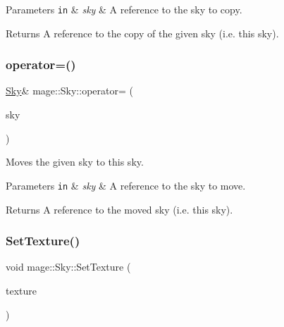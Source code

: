 \begin{DoxyParams}[1]{Parameters}
\mbox{\tt in}  & {\em sky} & A reference to the sky to copy. \\
\hline
\end{DoxyParams}
\begin{DoxyReturn}{Returns}
A reference to the copy of the given sky (i.\+e. this sky). 
\end{DoxyReturn}
\hypertarget{structmage_1_1_sky_a07e7ad68f471344d06357ea68b82ef84}{}\label{structmage_1_1_sky_a07e7ad68f471344d06357ea68b82ef84} 
\subsubsection{\texorpdfstring{operator=()}{operator=()}\hspace{0.1cm}{\footnotesize\ttfamily [2/2]}}
{\footnotesize\ttfamily \hyperlink{structmage_1_1_sky}{Sky}\& mage\+::\+Sky\+::operator= (\begin{DoxyParamCaption}\item[{\hyperlink{structmage_1_1_sky}{Sky} \&\&}]{sky }\end{DoxyParamCaption})\hspace{0.3cm}{\ttfamily [delete]}}

Moves the given sky to this sky.


\begin{DoxyParams}[1]{Parameters}
\mbox{\tt in}  & {\em sky} & A reference to the sky to move. \\
\hline
\end{DoxyParams}
\begin{DoxyReturn}{Returns}
A reference to the moved sky (i.\+e. this sky). 
\end{DoxyReturn}
\hypertarget{structmage_1_1_sky_aceb336c88ac33bb8490987812414578c}{}\label{structmage_1_1_sky_aceb336c88ac33bb8490987812414578c} 
\subsubsection{\texorpdfstring{Set\+Texture()}{SetTexture()}}
{\footnotesize\ttfamily void mage\+::\+Sky\+::\+Set\+Texture (\begin{DoxyParamCaption}\item[{const \hyperlink{namespacemage_a1e01ae66713838a7a67d30e44c67703e}{Shared\+Ptr}$<$ const \hyperlink{classmage_1_1_texture}{Texture} $>$ \&}]{texture }\end{DoxyParamCaption})}

